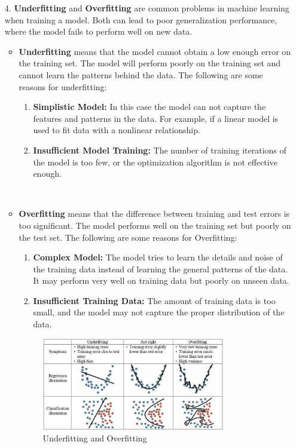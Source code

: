 \documentclass[english,version-2022-01]{uzl-thesis}
\begin{document}
\begin{itemize}
\begin{itemize}
        \end{itemize}\\
    \item[4.] \textbf{Underfitting} and \textbf{Overfitting} are common problems in machine learning when training a model. Both can lead to poor generalization performance, where the model fails to perform well on new data.\cite{overfittingandunderfitting}\\
    \begin{itemize}
    \item \textbf{Underfitting} means that the model cannot obtain a low enough error on the training set. The model will perform poorly on the training set and cannot learn the patterns behind the data. The following are some reasons for underfitting:
    \begin{enumerate}
        \item \textbf{Simplistic Model:} In this case the model can not capture the features and patterns in the data. For example, if a linear model is used to fit data with a nonlinear relationship.
        \item \textbf{Insufficient Model Training:} The number of training iterations of the model is too few, or the optimization algorithm is not effective enough.
    \end{enumerate}
    \\
    \item \textbf{Overfitting} means that the difference between training and test errors is too significant. The model performs well on the training set but poorly on the test set. The following are some reasons for Overfitting:
    \begin{enumerate}
        \item \textbf{Complex Model:} The model tries to learn the details and noise of the training data instead of learning the general patterns of the data. It may perform very well on training data but poorly on unseen data.
        \item \textbf{Insufficient Training Data:} The amount of training data is too small, and the model may not capture the proper distribution of the data.
    \end{enumerate}
     \begin{figure}[htpb]
       \centering
       \includegraphics[width=0.8\textwidth]{pic/Underfitting_Overfitting.png}
       \caption{Underfitting and Overfitting\cite{overfittingandunderfitting}}
       \label{overfittingandunderfitting_fig}
    \end{figure}
    \end{itemize}
    
\end{itemize}
\end{document}

